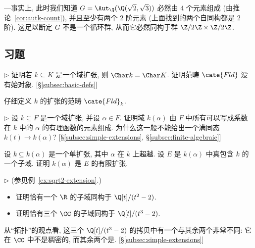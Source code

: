 \begin{example}
—事实上, 此时我们知道 $G=\Aut_{\Q}(\Q(\sqrt{2},\sqrt{3}))$ 必然由 $4$ 个元素组成 (由推论~\ref{cor:autk-count}), 并且至少有两个 $2$ 阶元素 (上面找到的两个自同构都是 $2$ 阶). 这足以断定 $G$ 不是一个循环群, 从而它必然同构于群 $\Z/2\Z\times\Z/2\Z$.
\end{example}

\subsection*{习题}
{}

\begin{prob}\label{ex:char-ext-equal}
$\triangleright$ 证明若 $k\subseteq K$ 是一个域扩张, 则 $\Char k=\Char K$. 证明范畴 $\cate{Fld}$ 没有始对象. [§\ref{subsec:basic-defs}]
\end{prob}

\begin{prob}\label{ex:cat-fldk}
仔细定义 $k$ 的扩张的范畴 $\cate{Fld}_k$.
\end{prob}

\begin{prob}\label{ex:rational-fcn-alpha}
$\triangleright$ 设 $k\subseteq F$ 是一个域扩张, 并设 $\alpha\in F$. 证明域 $k(\alpha)$ 由 $F$ 中所有可以写成系数在 $k$ 中的 $\alpha$ 的有理函数的元素组成. 为什么这一般不能给出一个满同态 $k(t)\to k(\alpha)$? [§\ref{subsec:simple-extensions}, §\ref{subsec:finite-algebraic}]
\end{prob}

\begin{prob}\label{ex:simple-trans-algebraic}
设 $k\subseteq k(\alpha)$ 是一个单扩张, 其中 $\alpha$ 在 $k$ 上超越. 设 $E$ 是 $k(\alpha)$ 中真包含 $k$ 的一个子域. 证明 $k(\alpha)$ 是 $E$ 的有限扩张.
\end{prob}

\begin{prob}\label{ex:three-subfields}
$\triangleright$ (参见例~\ref{ex:sqrt2-extension}.)

\begin{itemize}
\item 证明恰有一个 $\R$ 的子域同构于 $\Q[t]/(t^2-2)$.
\item 证明恰有三个 $\CC$ 的子域同构于 $\Q[t]/(t^3-2)$.
\end{itemize}
从``拓扑''的观点看, 这三个 $\Q[t]/(t^3-2)$ 的拷贝中有一个与其余两个非常不同: 它在 $\CC$ 中不是稠密的, 而其余两个是. [§\ref{subsec:simple-extensions}]
\end{prob}

